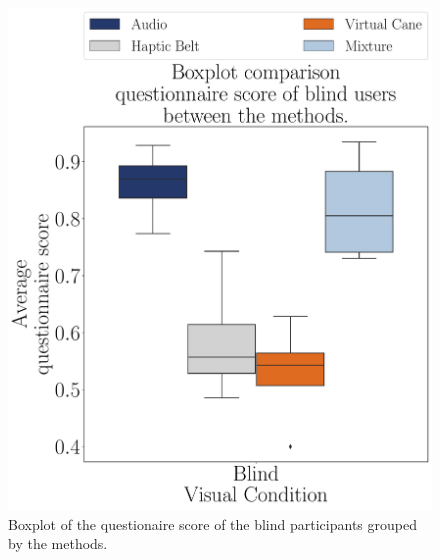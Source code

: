 \begin{figure}[!htb]
    \centering
    \includegraphics[width = 0.75\linewidth]{Resultados/Questionario/Figuras/pdf/boxplot_questionnaire_scene_blind.pdf}
    \caption{Boxplot of the questionaire score of the blind participants grouped by the methods.}
    \label{fig:boxplot_quest_blind_scene}
\end{figure}

%
%



